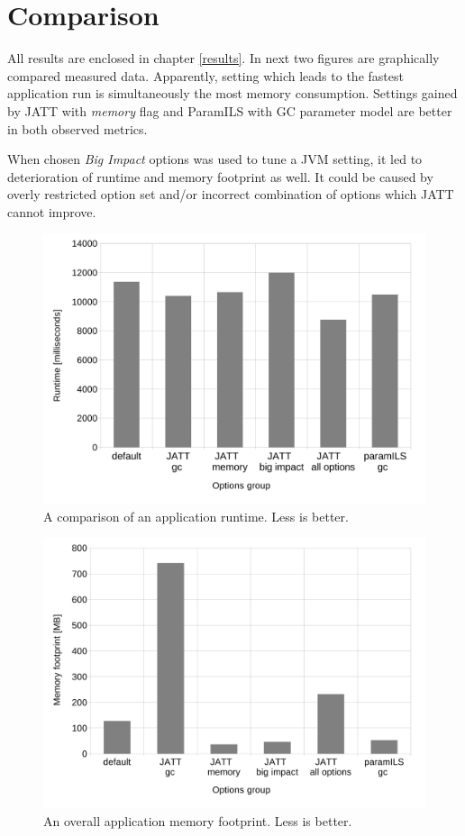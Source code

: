 \documentclass[
  digital, %
  oneside,
  notable, %
  nolof,     %
  nolot     %
]{fithesis3}
\begin{document}
\section{Comparison}
All results are enclosed in chapter \ref{results}. In next two figures are graphically compared measured data. Apparently, setting which leads to the fastest application run is simultaneously the most memory consumption. Settings gained by JATT with \textit{memory} flag and ParamILS with GC parameter model are better in both observed metrics.

When chosen \textit{Big Impact} options was used to tune a JVM setting, it led to deterioration of runtime and memory footprint as well. It could be caused by overly restricted option set and/or incorrect combination of options which JATT cannot improve.

\begin{figure}[h]
	\centering
	\includegraphics[width=13cm]{fig/runtimeBiggerFont.pdf}
	\caption{A comparison of an application runtime. Less is better.}
	\label{runtime}
\end{figure}

\begin{figure}[h]
	\centering
	\includegraphics[width=13cm]{fig/footprintBiggerFont.pdf}
	\caption{An overall application memory footprint. Less is better.}
	\label{footprint}
\end{figure}
\end{document}
